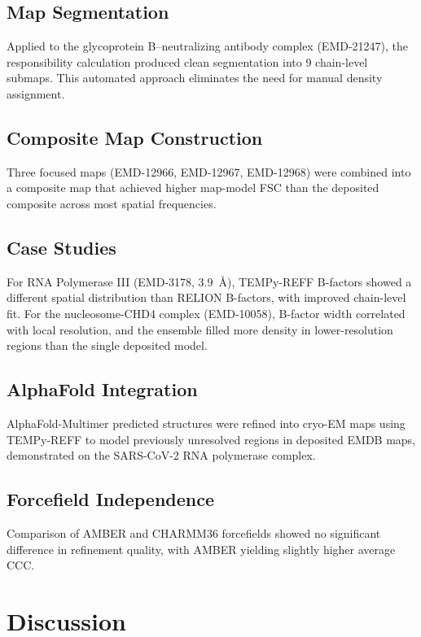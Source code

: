 \documentclass[11pt]{article}
\begin{document}
\subsection{Map Segmentation}

Applied to the glycoprotein B--neutralizing antibody complex (EMD-21247), the responsibility calculation produced clean segmentation into 9 chain-level submaps. This automated approach eliminates the need for manual density assignment.

\subsection{Composite Map Construction}

Three focused maps (EMD-12966, EMD-12967, EMD-12968) were combined into a composite map that achieved higher map-model FSC than the deposited composite across most spatial frequencies.

\subsection{Case Studies}

For RNA Polymerase III (EMD-3178, 3.9~\AA), TEMPy-REFF B-factors showed a different spatial distribution than RELION B-factors, with improved chain-level fit. For the nucleosome-CHD4 complex (EMD-10058), B-factor width correlated with local resolution, and the ensemble filled more density in lower-resolution regions than the single deposited model.

\subsection{AlphaFold Integration}

AlphaFold-Multimer \citep{evans2022alphafold} predicted structures were refined into cryo-EM maps using TEMPy-REFF to model previously unresolved regions in deposited EMDB maps, demonstrated on the SARS-CoV-2 RNA polymerase complex.

\subsection{Forcefield Independence}

Comparison of AMBER and CHARMM36 forcefields showed no significant difference in refinement quality, with AMBER yielding slightly higher average CCC.

\section{Discussion}
\end{document}

